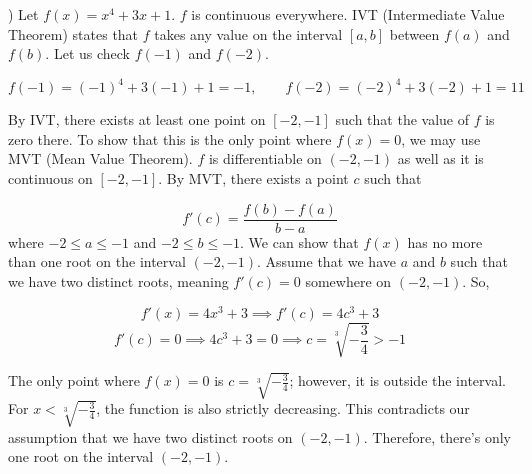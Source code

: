 \documentclass{article}
\begin{document}
\begin{center}
\end{center}

\newpage

) Let $f(x) = x^4 +3x+1$. $f$ is continuous everywhere. IVT (Intermediate Value Theorem) states that $f$ takes any value on the interval $[a, b]$ between $f(a)$ and $f(b)$. Let us check $f(-1)$ and $f(-2)$.

\[ f(-1) = (-1)^4 + 3(-1) + 1 = -1,\qquad f(-2) = (-2)^4 + 3(-2) + 1 = 11\]

\hfill

\noindent By IVT, there exists at least one point on $[-2, -1]$ such that the value of $f$ is zero there. To show that this is the only point where $f(x) = 0$, we may use MVT (Mean Value Theorem). $f$ is differentiable on $(-2, -1)$ as well as it is continuous on $[-2, -1]$. By MVT, there exists a point $c$ such that

\[ f'(c) = \frac{f(b) - f(a)}{b-a}\] where $-2 \leq a \leq -1$ and $-2 \leq b \leq -1$. We can show that $f(x)$ has no more than one root on the interval $(-2, -1)$. Assume that we have $a$ and $b$ such that we have two distinct roots, meaning $f'(c) = 0$ somewhere on $(-2, -1)$. So,

\[f'(x)=4x^3+3\implies f'(c)=4c^3+3\]
\[f'(c)=0\implies4c^3+3=0\implies c=\sqrt[3]{-\frac{3}{4}}>-1\]

\noindent The only point where $f(x)=0$ is $c=\sqrt[3]{-\frac{3}{4}}$; however, it is outside the interval. For $x < \sqrt[3]{-\frac{3}{4}}$, the function is also strictly decreasing. This contradicts our assumption that we have two distinct roots on $(-2, -1)$. Therefore, there's only one root on the interval $(-2,-1)$.
\end{document}
